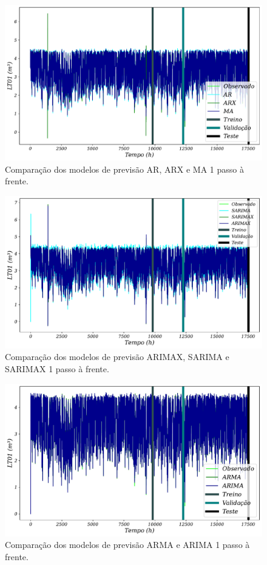 \begin{figure}[!htb]
	\centering
	\caption{Comparação dos modelos de previsão AR, ARX e MA 1 passo à frente.}
	\label{fig:1-ar-arx-ma}
	\includegraphics[width=0.7\linewidth]{Resultados/Figuras/1-AR-ARX-MA}
	
\end{figure}
\begin{figure}[!htb]
	\centering
	\caption{Comparação dos modelos de previsão ARIMAX, SARIMA e SARIMAX 1 passo à frente.}
	\label{fig:1-arimax-sarima-sarimax}
	\includegraphics[width=0.7\linewidth]{Resultados/Figuras/1-ARIMAX-SARIMA-SARIMAX}
	
\end{figure}
\begin{figure}[!htb]
	\centering
	\caption{Comparação dos modelos de previsão ARMA e ARIMA 1 passo à frente.}
	\label{fig:1-arma-arima}
	\includegraphics[width=0.7\linewidth]{Resultados/Figuras/1-ARMA-ARIMA}
	
\end{figure}
